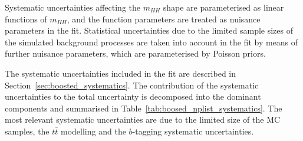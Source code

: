 Systematic uncertainties affecting the $m_{HH}$ shape are parameterised as linear functions of $m_{HH}$,
and the function parameters are treated as nuisance parameters in the fit. Statistical uncertainties due to the limited
sample sizes of the simulated background processes are taken into
account in the fit by means of further nuisance parameters, which are
parameterised by Poisson priors.
 
The systematic uncertainties included in the fit are described in
Section~\ref{sec:boosted_systematics}. The contribution of the systematic uncertainties to the
total uncertainty is decomposed into the dominant components and summarised  in
Table~\ref{tab:boosed_nplist_systematics}. The most relevant
systematic uncertainties are due to the limited size of the MC
samples, the $t \bar{t}$ modelling and the $b$-tagging systematic uncertainties.
 
